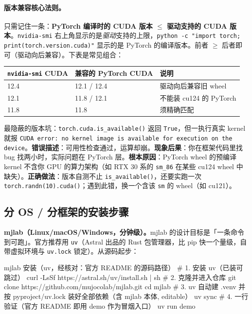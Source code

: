 \paragraph{版本兼容核心法则。}只需记住一条：\textbf{PyTorch 编译时的 CUDA 版本 $\le$ 驱动支持的 CUDA 版本}。\verb|nvidia-smi| 右上角显示的是\emph{驱动}支持的上限，\verb|python -c "import torch; print(torch.version.cuda)"| 显示的是 PyTorch 的编译版本。前者 $\ge$ 后者即可（驱动向后兼容）。下表是常见组合：

\begin{center}
\small
\begin{tabular}{@{}lll@{}}
\toprule
\verb|nvidia-smi| CUDA & 兼容的 PyTorch CUDA & 说明 \\
\midrule
12.4 & 12.1 / 12.4 & 驱动向后兼容旧 wheel \\
12.1 & 11.8 / 12.1 & 不能装 cu124 的 PyTorch \\
11.8 & 11.8 & 须精确匹配 \\
\bottomrule
\end{tabular}
\end{center}

\begin{pitfall}[\texttt{cuda.is\_available()==True} 不等于 kernel 兼容]
最隐蔽的版本坑：\verb|torch.cuda.is_available()| 返回 \verb|True|，但一执行真实 kernel 就报 \verb|CUDA error: no kernel image is available for execution on the device|。\textbf{错误描述}：可用性检查通过，运算却崩。\textbf{现象后果}：你在框架代码里找 bug 找两小时，实际问题在 PyTorch 层。\textbf{根本原因}：PyTorch wheel 的预编译 kernel 不含你 GPU 的算力架构（如 RTX 30 系的 \texttt{sm\_86} 在某些 cu124 wheel 中缺失）。\textbf{正确做法}：版本自测不止 \verb|is_available()|，还要实跑一次 \verb|torch.randn(10).cuda()|；遇到此错，换一个含该 \texttt{sm} 的 wheel（如 cu121）。
\end{pitfall}

\subsection*{分 OS / 分框架的安装步骤}

\textbf{mjlab（Linux/macOS/Windows，分钟级）。}mjlab 的设计目标是「一条命令到可跑」。官方推荐用 \verb|uv|（Astral 出品的 Rust 包管理器，比 pip 快一个量级，自带虚拟环境与 \verb|uv.lock| 锁定）。从源码起步：

\begin{codebox}[bash]{mjlab 安装（uv，经核对：官方 README 的源码路径）}
# 1. 安装 uv（已装可跳过）
curl -LsSf https://astral.sh/uv/install.sh | sh
# 2. 克隆并进入仓库
git clone https://github.com/mujocolab/mjlab.git
cd mjlab
# 3. uv 自动建 .venv 并按 pyproject/uv.lock 装好全部依赖（含 mjlab 本体, editable）
uv sync
# 4. 一行验证（官方 README 即用 demo 作为冒烟入口）
uv run demo
\end{codebox}

